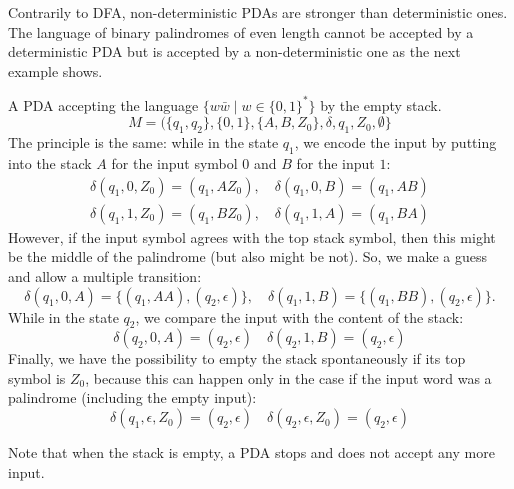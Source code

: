 \begin{page}


Contrarily to DFA, non-deterministic PDAs are stronger than deterministic ones.
The language of binary palindromes of even length cannot be accepted by a deterministic PDA
but is accepted by a non-deterministic one as the next example shows.


\end{page}

\begin{page}

\begin{exl}
\label{exl:Palindromes}
A PDA accepting the language $\{w \bar{w} \mid w \in \{0,1\}^*\}$ by the empty stack.
\[
M = (\{q_1, q_2\}, \{0, 1\}, \{A, B, Z_0\}, \delta, q_1, Z_0, \emptyset\}
\]
The principle is the same: while in the state $q_1$, we encode the input by putting into the stack $A$ for the input symbol $0$ and $B$ for the input $1$:
\begin{gather*}
\delta(q_1, 0, Z_0) = (q_1, AZ_0), \quad \delta(q_1, 0, B) = (q_1, AB)\\
\delta(q_1, 1, Z_0) = (q_1, BZ_0), \quad \delta(q_1, 1, A) = (q_1, BA)
\end{gather*}
However, if the input symbol agrees with the top stack symbol, then this might be the middle of the palindrome (but also might be not).
So, we make a guess and allow a multiple transition:
\[
\delta(q_1, 0, A) = \{(q_1, AA), (q_2, \epsilon)\}, \quad \delta(q_1, 1, B) = \{(q_1, BB), (q_2, \epsilon)\}.
\]
While in the state $q_2$, we compare the input with the content of the stack:
\[
\delta(q_2, 0, A) = (q_2, \epsilon) \quad \delta(q_2, 1, B) = (q_2, \epsilon)
\]
Finally, we have the possibility to empty the stack spontaneously if its top symbol is $Z_0$,
because this can happen only in the case if the input word was a palindrome (including the empty input):
\[
\delta(q_1, \epsilon, Z_0) = (q_2, \epsilon) \quad \delta(q_2, \epsilon, Z_0) = (q_2, \epsilon)
\]
\end{exl}

\end{page}

\begin{page}


Note that when the stack is empty, a PDA stops and does not accept any more input.



\end{page}

